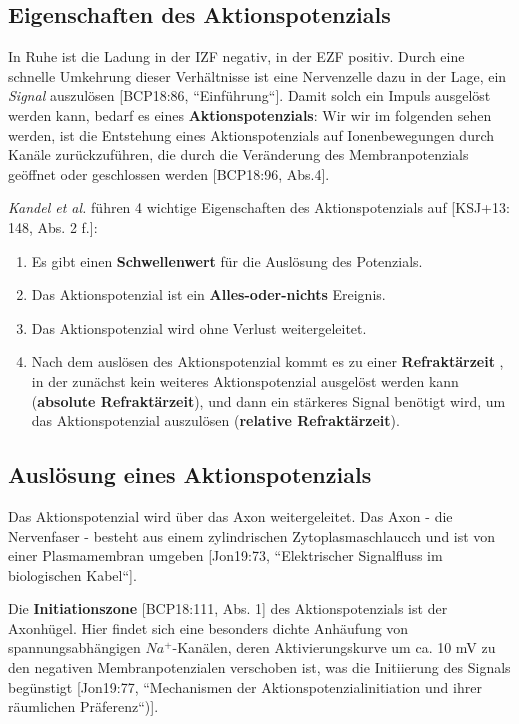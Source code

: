 {{\subsection{Eigenschaften des Aktionspotenzials}

In Ruhe ist die Ladung in der IZF negativ, in der EZF positiv.
Durch eine schnelle Umkehrung dieser Verhältnisse ist eine Nervenzelle dazu in der Lage, ein \textit{Signal} auszulösen [BCP18:86, ``Einführung``].
Damit solch ein Impuls ausgelöst werden kann, bedarf es eines \textbf{Aktionspotenzials}: Wir wir im folgenden sehen werden, ist die Entstehung eines Aktionspotenzials auf Ionenbewegungen durch Kanäle zurückzuführen, die durch die Veränderung des Membranpotenzials geöffnet oder geschlossen werden [BCP18:96, Abs.4].

 \textit{Kandel et al.} führen 4 wichtige Eigenschaften des Aktionspotenzials auf [KSJ+13: 148, Abs. 2 f.]:
\begin{enumerate}
 \item Es gibt einen \textbf{Schwellenwert} für die Auslösung des Potenzials.
 \item Das Aktionspotenzial ist ein \textbf{Alles-oder-nichts} Ereignis.
 \item Das Aktionspotenzial wird ohne Verlust weitergeleitet.
 \item Nach dem auslösen des Aktionspotenzial kommt es zu einer \textbf{Refraktärzeit} , in der zunächst kein weiteres Aktionspotenzial ausgelöst werden kann (\textbf{absolute Refraktärzeit}), und dann ein stärkeres Signal benötigt wird, um das Aktionspotenzial auszulösen (\textbf{relative Refraktärzeit}).
\end{enumerate}


\subsection{Auslösung eines Aktionspotenzials}

Das Aktionspotenzial wird über das Axon weitergeleitet. Das Axon - die Nervenfaser - besteht aus einem zylindrischen Zytoplasmaschlaucch und ist von einer Plasmamembran umgeben [Jon19:73, ``Elektrischer Signalfluss im biologischen Kabel``].

Die \textbf{Initiationszone} [BCP18:111, Abs. 1] des Aktionspotenzials ist der Axonhügel. Hier findet sich eine besonders dichte Anhäufung von spannungsabhängigen $Na^+$-Kanälen\footnotemark[41], deren Aktivierungskurve um ca. 10 mV zu den negativen Membranpotenzialen verschoben ist, was die Initiierung des Signals begünstigt [Jon19:77, ``Mechanismen der Aktionspotenzialinitiation und ihrer räumlichen Präferenz``)].

}}
